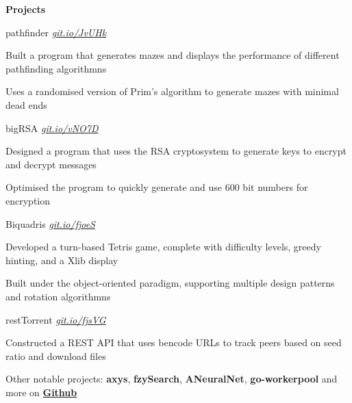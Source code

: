 \documentclass{resume} %
\DeclareRobustCommand{\&}{%
  \ifdim\fontdimen1\font>0pt
    \textsl{\symbol{`\&}}%
  \else
    \symbol{`\&}%
  \fi
}
\begin{document}

\begin{rSection}{\textbf{Projects}}

\begin{rSubsection}{pathfinder}
		{\em {\href{https://github.com/MSJawad/pathfinder}
				{git.io/JvUHk}}}
		{}
		
		\item Built a program that generates mazes and displays the performance of different pathfinding algorithmns
		\item	Uses a randomised version of Prim's algorithm to generate mazes with minimal dead ends
	\end{rSubsection}

  \begin{rSubsection}{bigRSA}
	  {\em {\href{https://github.com/MSJawad/bigRSA}
		    {git.io/vNO7D}}}
	  {}

    \item Designed a program that uses the RSA cryptosystem to generate keys to encrypt and decrypt messages
    \item Optimised the program to quickly generate and use 600 bit numbers for encryption
    
    \end{rSubsection}
    
   \begin{rSubsection}{Biquadris}
	  {\em {\href{https://github.com/MiltonIp/Biquadris}
		    {git.io/fjoeS}}}
	  {}

    \item Developed a turn-based Tetris game, complete with difficulty levels, greedy hinting, and a Xlib display
    \item Built under the object{-}oriented paradigm, supporting multiple design patterns and rotation algorithmns
 
  \end{rSubsection}
	
	  \begin{rSubsection}{restTorrent}
		{\em {\href{https://github.com/MSJawad/restTorrent}
				{git.io/fjsVG}}}
		{}
		
		\item  Constructed a REST API that uses bencode URLs to track peers based on seed ratio and download files
				
	\end{rSubsection}	
	
  \begin{rMinisection}
    \item {Other notable projects:} {\textbf{axys}},{ \textbf{fzySearch}},
      {\textbf{ANeuralNet}}, {\textbf{go-workerpool}} and more on
      \href{https://github.com/MSJawad}{\textbf{Github}}
  \end{rMinisection}
\end{rSection}
\end{document}
